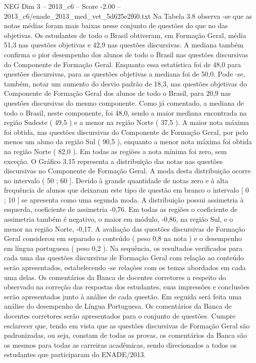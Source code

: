 \begin{textsample}{NEG Dim 3 – 2013\_c6 – Score -2.00 – 2013\_c6/enade\_2013\_med\_vet\_5d625e2f60.txt}
Na Tabela 3.8 observa -se que as notas médias foram mais baixas nesse conjunto de questões do que no das objetivas.
Os estudantes de todo o Brasil obtiveram, em Formação Geral, média 51,3 nas questões objetivas e 42,9 nas questões discursivas.
A mediana também confirma o pior desempenho dos alunos de todo o Brasil nas questões discursivas do Componente de Formação Geral.
Enquanto essa estatística foi de 48,0 para questões discursivas, para as questões objetivas a mediana foi de 50,0.
Pode -se, também, notar um aumento do desvio padrão de 18,3, nas questões objetivas do Componente de Formação Geral dos alunos de todo o Brasil, para 20,9 nas questões discursivas do mesmo componente.
Como já comentado, a mediana de todo o Brasil, neste componente, foi 48,0, sendo a maior mediana encontrada na região Sudeste ( 49,5 ) e a menor na região Norte ( 37,5 ).
A maior nota máxima foi obtida, nas questões discursivas do Componente de Formação Geral, por pelo menos um aluno da região Sul ( 90,5 ), enquanto a menor nota máxima foi obtida na região Norte ( 82,0 ).
Em todas as regiões a nota mínima foi zero, sem exceção.
O Gráfico 3.15 representa a distribuição das notas nas questões discursivas no Componente de Formação Geral.
A moda desta distribuição ocorre no intervalo ( 50 ; 60 ].
Devido à grande quantidade de notas zero e à alta frequência de alunos que deixaram este tipo de questão em branco o intervalo [ 0 ; 10 ] se apresenta como uma segunda moda.
A distribuição possui assimetria à esquerda, coeficiente de assimetria -0,76.
Em todas as regiões o coeficiente de assimetria também é negativo, o maior em módulo, -0,86, na região Sul, e o menor na região Norte, -0,17.
A avaliação das questões discursivas de Formação Geral considerou em separado o conteúdo ( peso 0,8 na nota ) e o desempenho em língua portuguesa ( peso 0,2 ).
Na sequência, os resultados verificados para cada uma das questões discursivas de Formação Geral com relação ao conteúdo serão apresentados, estabelecendo -se relações com os temas abordados em cada uma delas.
Os comentários da Banca de docentes corretores a respeito do observado na correção das respostas dos estudantes, suas impressões e conclusões serão apresentados junto à análise de cada questão.
Em seguida será feita uma análise do desempenho de Língua Portuguesa.
Os comentários da Banca de docentes corretores serão apresentados para o conjunto de questões.
Cumpre esclarecer que, tendo em vista que as questões discursivas de Formação Geral são padronizadas, ou seja, constam de todas as provas, os comentários da Banca são os mesmos para todas as carreiras acadêmicas, sendo direcionados a todos os estudantes que participaram do ENADE/2013.

\end{textsample}

